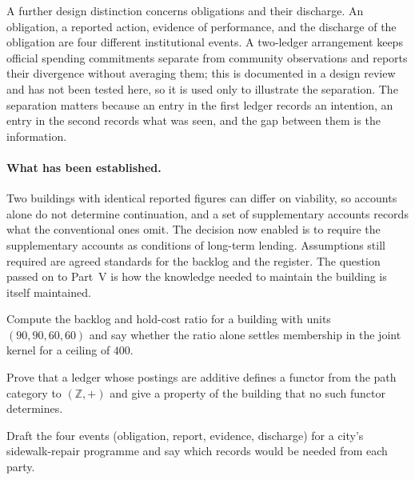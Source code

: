 A further design distinction concerns obligations and their discharge. An obligation, a reported action, evidence of performance, and the discharge of the obligation are four different institutional events. A two-ledger arrangement keeps official spending commitments separate from community observations and reports their divergence without averaging them; this is documented in a design review and has not been tested here, so it is used only to illustrate the separation. The separation matters because an entry in the first ledger records an intention, an entry in the second records what was seen, and the gap between them is the information.

\paragraph{What has been established.} Two buildings with identical reported figures can differ on viability, so accounts alone do not determine continuation, and a set of supplementary accounts records what the conventional ones omit. The decision now enabled is to require the supplementary accounts as conditions of long-term lending. Assumptions still required are agreed standards for the backlog and the register. The question passed on to Part~V is how the knowledge needed to maintain the building is itself maintained.

\begin{exercise}
Compute the backlog and hold-cost ratio for a building with units $(90,90,60,60)$ and say whether the ratio alone settles membership in the joint kernel for a ceiling of $400$.
\end{exercise}
\begin{exercise}
Prove that a ledger whose postings are additive defines a functor from the path category to $(\mathbb Z,+)$ and give a property of the building that no such functor determines.
\end{exercise}
\begin{exercise}
Draft the four events (obligation, report, evidence, discharge) for a city's sidewalk-repair programme and say which records would be needed from each party.
\end{exercise}
